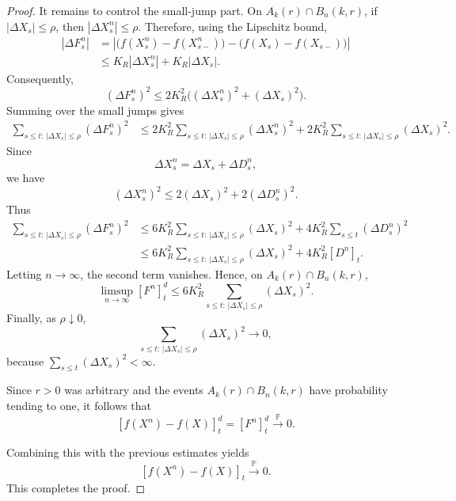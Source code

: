 \documentclass[a4paper,10pt]{article}
\begin{document}
\begin{proof}
It remains to control the small-jump part. On
\(A_k(r)\cap B_n(k,r)\), if \(|\Delta X_s|\le \rho\), then
\(|\Delta X^n_s|\le \rho\). Therefore, using the Lipschitz bound,
\[
\begin{aligned}
|\Delta F^n_s|
&=
\left|
        \bigl(f(X^n_s)-f(X^n_{s-})\bigr)
        -
        \bigl(f(X_s)-f(X_{s-})\bigr)
\right|
\\
&\le
        K_R |\Delta X^n_s|
        +
        K_R |\Delta X_s|.
\end{aligned}
\]
Consequently,
\[
        (\Delta F^n_s)^2
        \le
        2K_R^2\bigl((\Delta X^n_s)^2+(\Delta X_s)^2\bigr).
\]
Summing over the small jumps gives
\[
\begin{aligned}
\sum_{s\le t:\,|\Delta X_s|\le \rho}(\Delta F^n_s)^2
&\le
        2K_R^2
        \sum_{s\le t:\,|\Delta X_s|\le \rho}(\Delta X^n_s)^2
        +
        2K_R^2
        \sum_{s\le t:\,|\Delta X_s|\le \rho}(\Delta X_s)^2.
\end{aligned}
\]
Since
\[
        \Delta X^n_s=\Delta X_s+\Delta D^n_s,
\]
we have
\[
        (\Delta X^n_s)^2
        \le
        2(\Delta X_s)^2+2(\Delta D^n_s)^2.
\]
Thus
\[
\begin{aligned}
\sum_{s\le t:\,|\Delta X_s|\le \rho}(\Delta F^n_s)^2
&\le
        6K_R^2
        \sum_{s\le t:\,|\Delta X_s|\le \rho}(\Delta X_s)^2
        +
        4K_R^2
        \sum_{s\le t}(\Delta D^n_s)^2
\\
&\le
        6K_R^2
        \sum_{s\le t:\,|\Delta X_s|\le \rho}(\Delta X_s)^2
        +
        4K_R^2 [D^n]_t .
\end{aligned}
\]
Letting \(n\to\infty\), the second term vanishes. Hence, on
\(A_k(r)\cap B_n(k,r)\),
\[
        \limsup_{n\to\infty}[F^n]^d_t
        \le
        6K_R^2
        \sum_{s\le t:\,|\Delta X_s|\le \rho}(\Delta X_s)^2.
\]
Finally, as \(\rho\downarrow0\),
\[
        \sum_{s\le t:\,|\Delta X_s|\le \rho}(\Delta X_s)^2
        \longrightarrow0,
\]
because
$
        \sum_{s\le t}(\Delta X_s)^2<\infty.
$

Since \(r>0\) was arbitrary and the events \(A_k(r)\cap B_n(k,r)\) have
probability tending to one, it follows that
\[
        [f(X^n)-f(X)]^d_t
        =
        [F^n]^d_t
        \xrightarrow{\mathbb P}0.
\]

Combining this with the previous estimates yields
\[
        [f(X^n)-f(X)]_t\xrightarrow{\mathbb P}0.
\]
This completes the proof.
\end{proof}
\end{document}
